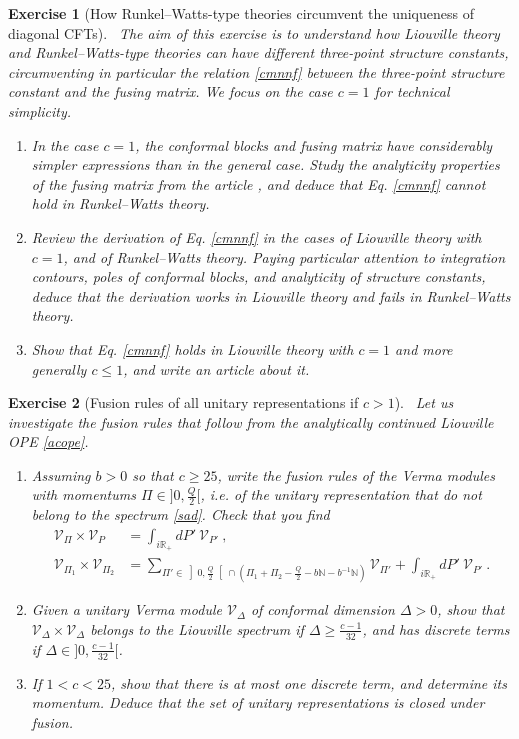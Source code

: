 \documentclass[12pt, a4paper, notitlepage, twoside]{report}
\numberwithin{equation}{section}
\theoremstyle{break}
\newtheorem{exo}{Exercise}[chapter]
\begin{document}
\begin{exo}[How Runkel--Watts-type theories circumvent the uniqueness of diagonal CFTs]
 ~\label{exonurw}
The aim of this exercise is to understand how Liouville theory and Runkel--Watts-type theories can have different three-point structure constants, circumventing in particular the relation \eqref{cmnnf} between the three-point structure constant and the fusing matrix. We focus on the case $c=1$ for technical simplicity. 
\begin{enumerate}
 \item In the case $c=1$, the conformal blocks and fusing matrix have considerably simpler expressions than in the general case. Study the analyticity properties of the fusing matrix from the article \cite{ilt13}, and deduce that Eq. \eqref{cmnnf} cannot hold in Runkel--Watts theory. 
 \item Review the derivation of Eq. \eqref{cmnnf} in the cases of Liouville theory with $c=1$, and of Runkel--Watts theory. Paying particular attention to integration contours, poles of conformal blocks, and analyticity of structure constants, deduce that the derivation works in Liouville theory and fails in Runkel--Watts theory.
 \item Show that  Eq. \eqref{cmnnf} holds in Liouville theory with $c=1$ and more generally $c\leq 1$, and write an article about it.
\end{enumerate}
\end{exo}



\begin{exo}[Fusion rules of all unitary representations if $c>1$]
 ~\label{exoaur}
 Let us investigate the fusion rules that follow from the analytically continued Liouville OPE \eqref{acope}.
 \begin{enumerate}
  \item Assuming $b>0$ so that $c\geq 25$, write the fusion rules of the Verma modules with momentums $\Pi\in ]0,\frac{Q}{2}[$, i.e. of the unitary representation that do not belong to the spectrum \eqref{sad}.  Check that you find
\begin{align}
 \mathcal{V}_\Pi \times \mathcal{V}_P  
&= \int_{i\mathbb{R}_+} dP'\ \mathcal{V}_{P'}\ ,
\\
 \mathcal{V}_{\Pi_1} \times \mathcal{V}_{\Pi_2} 
&= \sum_{\Pi'\in \left]0,\frac{Q}{2}\right[\cap \left(\Pi_1+\Pi_2 -\frac{Q}{2}- b\mathbb{N}-b^{-1}\mathbb{N}\right)} \mathcal{V}_{\Pi'}  
+ \int_{i\mathbb{R}_+} dP'\ \mathcal{V}_{P'}\ .
\end{align}
\item Given a unitary Verma module $\mathcal{V}_\Delta$ of conformal dimension $\Delta>0$, show that $\mathcal{V}_\Delta \times \mathcal{V}_\Delta$ belongs to the Liouville spectrum if $\Delta \geq \frac{c-1}{32}$, and has discrete terms if $\Delta \in ]0,\frac{c-1}{32}[$.
\item If $1<c<25$, show that there is at most one discrete term, and determine its momentum. Deduce that the set of unitary representations is closed under fusion.
 \end{enumerate}
\end{exo}
\end{document}
